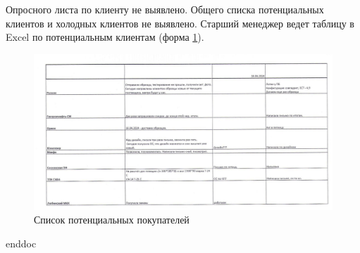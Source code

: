 Опросного листа по клиенту не выявлено.
%
Общего списка потенциальных клиентов и холодных клиентов не выявлено.
Старший менеджер ведет таблицу в Excel по потенциальным клиентам (форма \ref{pic:d3}).
%
%
%
%
\begin{figure}
\begin{center}
 \includegraphics[height=0.5\textheight, angle=90, keepaspectratio]{Pics/d03.jpg}
\end{center}
 \caption{Список потенциальных покупателей}
 \label{pic:d3}
\end{figure}
\clearpage
%
%


\clearpage
 {enddoc} 
